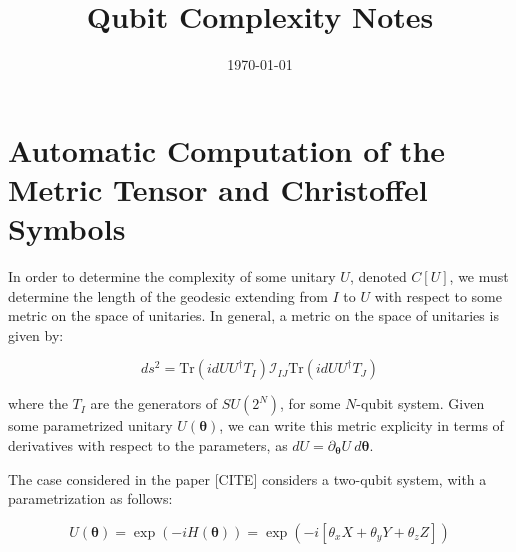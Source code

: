 \documentclass[superscriptaddress,pra,nofootinbib,notitlepage, floatfix]{revtex4-1}
\begin{document}
\title{Qubit Complexity Notes}

\date{\today}

\maketitle

\section{Automatic Computation of the Metric Tensor and Christoffel Symbols}

In order to determine the complexity of some unitary $U$, denoted $C[U]$, we must determine the length of the geodesic extending from $I$ to $U$ with respect to some metric on the space of unitaries.
In general, a metric on the space of unitaries is given by:

\begin{equation}
  ds^2 = \text{Tr}(i dU U^{\dagger} T_I) \mathcal{I}_{IJ} \text{Tr}(i dU U^{\dagger} T_J)
\end{equation}

where the $T_I$ are the generators of $SU(2^{N})$, for some $N$-qubit system. Given some parametrized unitary $U(\boldsymbol{\theta})$, we can write this metric explicity in terms of derivatives with respect to the parameters, as
$dU = \partial_{\boldsymbol{\theta}} U \ d\boldsymbol{\theta}$.
\newline

The case considered in the paper [CITE] considers a two-qubit system, with a parametrization as follows:

\begin{equation}
U(\boldsymbol{\theta}) = \exp( -i H(\boldsymbol\theta)) = \exp \left( -i [ \theta_x X + \theta_y Y + \theta_z Z ] \right)
\end{equation}




\end{document}
